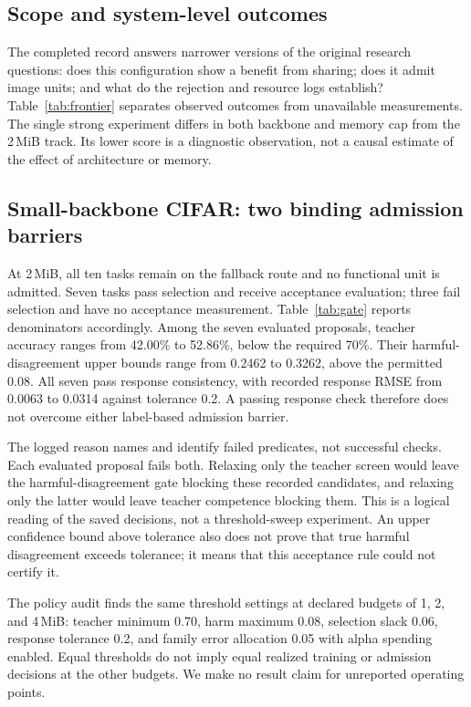 \documentclass{article}
\begin{document}
\subsection{Scope and system-level outcomes}
The completed record answers narrower versions of the original research questions: does this configuration show a benefit from sharing; does it admit image units; and what do the rejection and resource logs establish? Table~\ref{tab:frontier} separates observed outcomes from unavailable measurements. The single strong experiment differs in both backbone and memory cap from the 2\,MiB track. Its lower score is a diagnostic observation, not a causal estimate of the effect of architecture or memory.




\subsection{Small-backbone CIFAR: two binding admission barriers}
At 2\,MiB, all ten tasks remain on the fallback route and no functional unit is admitted. Seven tasks pass selection and receive acceptance evaluation; three fail selection and have no acceptance measurement. Table~\ref{tab:gate} reports denominators accordingly. Among the seven evaluated proposals, teacher accuracy ranges from 42.00\% to 52.86\%, below the required 70\%. Their harmful-disagreement upper bounds range from 0.2462 to 0.3262, above the permitted 0.08. All seven pass response consistency, with recorded response RMSE from 0.0063 to 0.0314 against tolerance 0.2. A passing response check therefore does not overcome either label-based admission barrier.

The logged reason names  and  identify failed predicates, not successful checks. Each evaluated proposal fails both. Relaxing only the teacher screen would leave the harmful-disagreement gate blocking these recorded candidates, and relaxing only the latter would leave teacher competence blocking them. This is a logical reading of the saved decisions, not a threshold-sweep experiment. An upper confidence bound above tolerance also does not prove that true harmful disagreement exceeds tolerance; it means that this acceptance rule could not certify it.

The policy audit finds the same threshold settings at declared budgets of 1, 2, and 4\,MiB: teacher minimum 0.70, harm maximum 0.08, selection slack 0.06, response tolerance 0.2, and family error allocation 0.05 with alpha spending enabled. Equal thresholds do not imply equal realized training or admission decisions at the other budgets. We make no result claim for unreported operating points.
\end{document}
